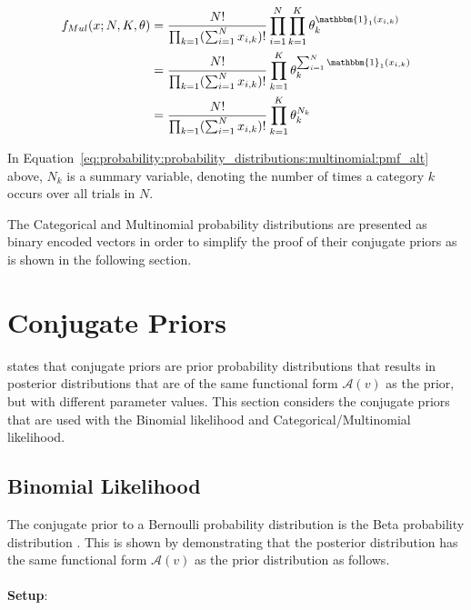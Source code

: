 \begin{equation}
      \label{eq:probability:probability_distributions:multinomial:pmf_alt}
      \begin{split}
            f_{Mul}(x; N, K, \theta) &= \frac{N!}{\prod_{k=1}(\sum_{i=1}^{N}x_{i, k})!}\prod_{i=1}^{N}\prod_{k=1}^{K}\theta_{k}^{\mathbbm{1}_{1}(x_{i,k})} \\
            &= \frac{N!}{\prod_{k=1}(\sum_{i=1}^{N}x_{i, k})!} \prod_{k=1}^{K}\theta_{k}^{\sum_{i=1}^{N}\mathbbm{1}_{1}(x_{i,k})} \\
            &= \frac{N!}{\prod_{k=1}(\sum_{i=1}^{N}x_{i, k})!} \prod_{k=1}^{K}\theta_{k}^{N_{k}} \\
      \end{split}
\end{equation}

\noindent
In Equation~\eqref{eq:probability:probability_distributions:multinomial:pmf_alt} above, $N_{k}$ is a summary variable, denoting the number of times a category $k$ occurs over all trials in $N$.

The Categorical and Multinomial probability distributions are presented as binary encoded vectors in order to simplify the proof of their conjugate priors as is shown in the following section.


\section{Conjugate Priors}\label{sec:probability:conjugate_priors}

\citeauthor{ref:wackerly:2014}\cite{ref:wackerly:2014} states that conjugate priors are prior probability distributions that results in posterior distributions that are of the same functional form $\mathcal{A}(v)$ as the prior, but with different parameter values. This section considers the conjugate priors that are used with the Binomial likelihood and Categorical/Multinomial likelihood.

\subsection{Binomial Likelihood}\label{sec:probability:conjugate_priors:binom_likelihood}

The conjugate prior to a Bernoulli probability distribution is the Beta probability distribution
\cite{ref:wackerly:2014}. This is shown by demonstrating that the posterior distribution has the
same functional form $\mathcal{A}(v)$ as the prior distribution as follows. \\\\
\textbf{Setup}:

